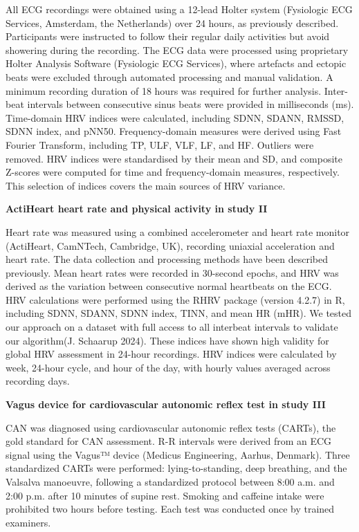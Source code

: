 \documentclass[
  a4paper,
  headsepline=true,
  open=any]{scrbook}
\begin{document}
All ECG recordings were obtained using a 12-lead Holter system
(Fysiologic ECG Services, Amsterdam, the Netherlands) over 24 hours, as
previously described. Participants were instructed to follow their
regular daily activities but avoid showering during the recording. The
ECG data were processed using proprietary Holter Analysis Software
(Fysiologic ECG Services), where artefacts and ectopic beats were
excluded through automated processing and manual validation. A minimum
recording duration of 18 hours was required for further analysis.
Inter-beat intervals between consecutive sinus beats were provided in
milliseconds (ms). Time-domain HRV indices were calculated, including
SDNN, SDANN, RMSSD, SDNN index, and pNN50. Frequency-domain measures
were derived using Fast Fourier Transform, including TP, ULF, VLF, LF,
and HF. Outliers were removed. HRV indices were standardised by their
mean and SD, and composite Z-scores were computed for time and
frequency-domain measures, respectively. This selection of indices
covers the main sources of HRV variance.

\textbf{ActiHeart heart rate and physical activity in study II}

Heart rate was measured using a combined accelerometer and heart rate
monitor (ActiHeart, CamNTech, Cambridge, UK), recording uniaxial
acceleration and heart rate. The data collection and processing methods
have been described previously. Mean heart rates were recorded in
30-second epochs, and HRV was derived as the variation between
consecutive normal heartbeats on the ECG. HRV calculations were
performed using the RHRV package (version 4.2.7) in R, including SDNN,
SDANN, SDNN index, TINN, and mean HR (mHR). We tested our approach on a
dataset with full access to all interbeat intervals to validate our
algorithm(J. Schaarup 2024). These indices have shown high validity for
global HRV assessment in 24-hour recordings. HRV indices were calculated
by week, 24-hour cycle, and hour of the day, with hourly values averaged
across recording days.

\textbf{Vagus device for cardiovascular autonomic reflex test in study
III}

CAN was diagnosed using cardiovascular autonomic reflex tests (CARTs),
the gold standard for CAN assessment. R-R intervals were derived from an
ECG signal using the Vagus™ device (Medicus Engineering, Aarhus,
Denmark). Three standardized CARTs were performed: lying-to-standing,
deep breathing, and the Valsalva manoeuvre, following a standardized
protocol between 8:00 a.m. and 2:00 p.m. after 10 minutes of supine
rest. Smoking and caffeine intake were prohibited two hours before
testing. Each test was conducted once by trained examiners.
\end{document}
